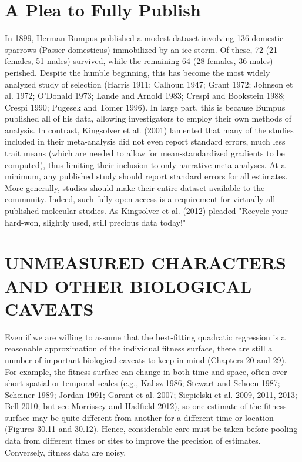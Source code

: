 \documentclass{article}
\begin{document}
\section{A Plea to Fully Publish}
In 1899, Herman Bumpus published a modest dataset involving 136 domestic sparrows (Passer domesticus) immobilized by an ice storm. Of these, 72 (21 females, 51 males) survived, while the remaining 64 (28 females, 36 males) perished. Despite the humble beginning, this has become the most widely analyzed study of selection (Harris 1911; Calhoun 1947; Grant 1972; Johnson et al. 1972; O'Donald 1973; Lande and Arnold 1983; Crespi and Bookstein 1988; Crespi 1990; Pugesek and Tomer 1996). In large part, this is because Bumpus published all of his data, allowing investigators to employ their own methods of analysis. In contrast, Kingsolver et al. (2001) lamented that many of the studies included in their meta-analysis did not even report standard errors, much less trait means (which are needed to allow for mean-standardized gradients to be computed), thus limiting their inclusion to only narrative meta-analyses. At a minimum, any published study should report standard errors for all estimates. More generally, studies should make their entire dataset available to the community. Indeed, such fully open access is a requirement for virtually all published molecular studies. As Kingsolver et al. (2012) pleaded "Recycle your hard-won, slightly used, still precious data today!"

\section{UNMEASURED CHARACTERS AND OTHER BIOLOGICAL CAVEATS}
Even if we are willing to assume that the best-fitting quadratic regression is a reasonable approximation of the individual fitness surface, there are still a number of important biological caveats to keep in mind (Chapters 20 and 29). For example, the fitness surface can change in both time and space, often over short spatial or temporal scales (e.g., Kalisz 1986; Stewart and Schoen 1987; Scheiner 1989; Jordan 1991; Garant et al. 2007; Siepielski et al. 2009, 2011, 2013; Bell 2010; but see Morrissey and Hadfield 2012), so one estimate of the fitness surface may be quite different from another for a different time or location (Figures 30.11 and 30.12). Hence, considerable care must be taken before pooling data from different times or sites to improve the precision of estimates. Conversely, fitness data are noisy,
\end{document}
